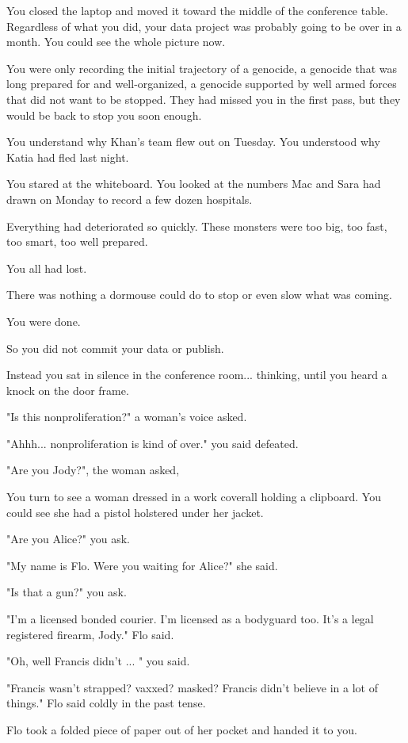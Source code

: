 \documentclass[a5paper, symmetric]{tufte-book}
\begin{document}
You closed the laptop and moved it toward the middle of the conference table. Regardless of what you did, your data project was probably going to be over in a month. You could see the whole picture now. 

You were only recording the initial trajectory of a genocide, a genocide that was long prepared for and well-organized, a genocide supported by well armed forces that did not want to be stopped. They had missed you in the first pass, but they would be back to stop you soon enough.

You understand why Khan's team flew out on Tuesday. You understood why Katia had fled last night.

You stared at the whiteboard. You looked at the numbers Mac and Sara had drawn on Monday to record a few dozen hospitals. 

Everything had deteriorated so quickly. These monsters were too big, too fast, too smart, too well prepared. 

You all had lost. 

There was nothing a dormouse could do to stop or even slow what was coming. 

You were done. 

So you did not commit your data or publish. 

Instead you sat in silence in the conference room... thinking, until you heard a knock on the door frame. 

"Is this nonproliferation?" a woman's voice asked. 

"Ahhh... nonproliferation is kind of over." you said defeated. 

"Are you Jody?", the woman asked, 

You turn to see a woman dressed in a work coverall holding a clipboard. You could see she had a pistol holstered under her jacket. 

"Are you Alice?" you ask. 

"My name is Flo. Were you waiting for Alice?" she said.

"Is that a gun?" you ask.

"I'm a licensed bonded courier. I'm licensed as a bodyguard too. It's a legal registered firearm, Jody." Flo said. 

"Oh, well Francis didn't ... " you said.

"Francis wasn't strapped? vaxxed? masked? Francis didn't believe in a lot of things." Flo said coldly in the past tense.

Flo took a folded piece of paper out of her pocket and handed it to you. 
\end{document}
